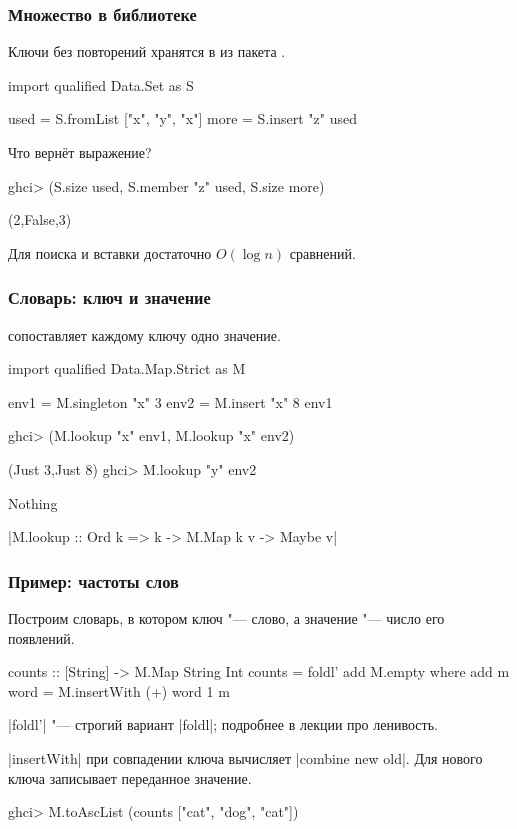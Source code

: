 \documentclass[11pt]{beamer}
\begin{document}
\begin{frame}[fragile]
  \frametitle{Множество в библиотеке}
  Ключи без повторений хранятся в \href{https://hackage.haskell.org/package/containers/docs/Data-Set.html}{} из пакета .
  \begin{haskell}
    import qualified Data.Set as S

    used = S.fromList ["x", "y", "x"]
    more = S.insert "z" used
  \end{haskell}
  Что вернёт выражение?
  \begin{haskellsmall}
    ghci> (S.size used, S.member "z" used, S.size more)
  \end{haskellsmall}
  \pause
  \begin{haskellsmall}
    (2,False,3)
  \end{haskellsmall}
  Для поиска и вставки достаточно $O(\log n)$ сравнений.
\end{frame}

\begin{frame}[fragile]
  \frametitle{Словарь: ключ и значение}
  \href{https://hackage.haskell.org/package/containers/docs/Data-Map-Strict.html}{} сопоставляет каждому ключу одно значение.
  \begin{haskellsmall}
    import qualified Data.Map.Strict as M

    env1 = M.singleton "x" 3
    env2 = M.insert "x" 8 env1
  \end{haskellsmall}
  \begin{haskellsmall}
    ghci> (M.lookup "x" env1, M.lookup "x" env2)
  \end{haskellsmall}
  \pause
  \begin{haskellsmall}
    (Just 3,Just 8)
    ghci> M.lookup "y" env2
  \end{haskellsmall}
  \pause
  \begin{haskellsmall}
    Nothing
  \end{haskellsmall}
  \haskinline|M.lookup :: Ord k => k -> M.Map k v -> Maybe v|
\end{frame}

\begin{frame}[fragile]
  \frametitle{Пример: частоты слов}
  Построим словарь, в котором ключ "--- слово, а значение "--- число его появлений.
  \begin{haskellsmall}
    counts :: [String] -> M.Map String Int
    counts = foldl' add M.empty
      where
        add m word = M.insertWith (+) word 1 m
  \end{haskellsmall}
  \haskinline|foldl'| "--- строгий вариант \haskinline|foldl|; подробнее в лекции про ленивость.

  \haskinline|insertWith| при совпадении ключа вычисляет \haskinline|combine new old|. Для нового ключа записывает переданное значение.
  \begin{haskellsmall}
    ghci> M.toAscList (counts ["cat", "dog", "cat"])
  \end{haskellsmall}
  \pause
  \begin{haskellsmall}
  \end{haskellsmall}
\end{frame}
\end{document}
